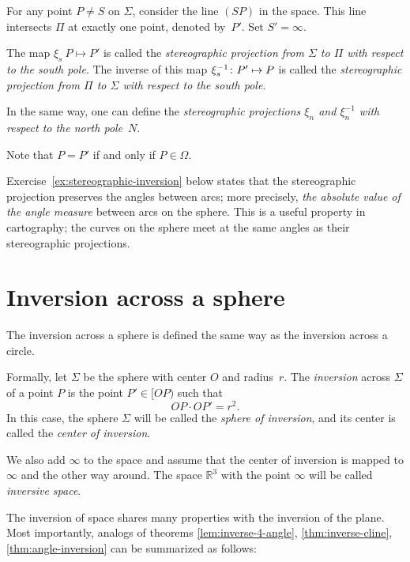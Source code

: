 For any point $P\ne S$ on $\Sigma$,
consider the line $(SP)$ in the space. 
This line intersects $\Pi$ at exactly one point, denoted by~$P'$. 
Set $S'=\infty$.


The map $\xi_s\: P\mapsto P'$ is called the \emph{stereographic projection from $\Sigma$ to $\Pi$ with respect to the south pole}.
The inverse of this map $\xi^{-1}_s\colon P'\mapsto P$ is called the {}\emph{stereographic projection from $\Pi$ to $\Sigma$ with respect to the south pole}.

In the same way, one can define the
{}\emph{stereographic projections $\xi_n$ and $\xi^{-1}_n$ with respect to the north pole}~$N$.

Note that $P=P'$ if and only if $P\in\Omega$.

Exercise~\ref{ex:stereographic-inversion} below states that the stereographic projection preserves 
the angles between arcs;
more precisely, \textit{the absolute value of the angle measure} between arcs on the sphere.
This is a useful property in cartography;
the curves on the sphere meet at the same angles as their stereographic projections.


\section[The inversion]{Inversion across a sphere}

The inversion across a sphere is defined the same way as the inversion across a circle.

Formally, let $\Sigma$ be the sphere with center $O$ and radius~$r$.
The \emph{inversion} across $\Sigma$ of a point $P$ is the point $P'\in[OP)$ such that
$$OP\cdot OP'=r^2.$$
In this case, the sphere $\Sigma$  will be called the 
\emph{sphere of inversion},
and its center is called the \emph{center of inversion}.

We also add $\infty$ to the space and assume that the center of inversion is mapped to $\infty$ and the other way around. 
The space $\mathbb{R}^3$ with the point $\infty$ will be called \emph{inversive space}.

The inversion of space shares many properties with the inversion of the plane.
Most importantly, analogs of theorems \ref{lem:inverse-4-angle}, \ref{thm:inverse-cline}, \ref{thm:angle-inversion} can be summarized as follows:

